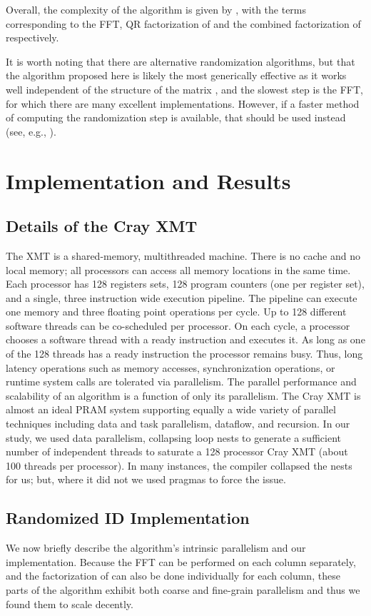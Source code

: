 \documentclass[11pt]{article}
\begin{document}
Overall, the complexity of the algorithm is given by , with the terms corresponding to the FFT, QR factorization of  and the combined factorization of  respectively.  

It is worth noting that there are alternative randomization algorithms, but that the algorithm proposed here is likely the most generically effective as it works well independent of the structure of the matrix , and the slowest step is the FFT, for which there are many excellent implementations.  However, if a faster method of computing the randomization step is available, that should be used instead (see, e.g., \cite{rokyale1, rokpnas}).   



\section{Implementation and Results}
\label{sec:xmt}
\subsection{Details of the Cray XMT}
The XMT is a shared-memory, multithreaded machine.  There is no cache and no local memory; all processors can access all memory locations in the same time.  Each processor has 128 registers sets, 128 program counters (one per register set), and a single, three instruction wide execution pipeline.  The pipeline can execute one memory and three floating point operations per cycle.  Up to 128 different software threads can be co-scheduled per processor.  On each cycle, a processor chooses a software thread with a ready instruction and executes it.  As long as one of the 128 threads has a ready instruction the processor remains busy.  Thus, long latency operations such as memory accesses, synchronization operations, or runtime system calls are tolerated via parallelism.  The parallel performance and scalability of an algorithm is a function of only its parallelism.  The Cray XMT is almost an ideal PRAM system supporting equally a wide variety of parallel techniques including data and task parallelism, dataflow, and recursion.  In our study, we used data parallelism, collapsing loop nests to generate a sufficient number of independent threads to saturate a 128 processor Cray XMT (about 100 threads per processor). In many instances, the compiler collapsed the nests for us; but, where it did not we used pragmas to force the issue. 
\subsection{Randomized ID Implementation}
We now briefly describe the algorithm's intrinsic parallelism and our implementation.  Because the FFT can be performed on each column separately, and the factorization of  can also be done individually for each column, these parts of the algorithm exhibit both coarse and fine-grain parallelism and thus we found them to scale decently.
\end{document}
